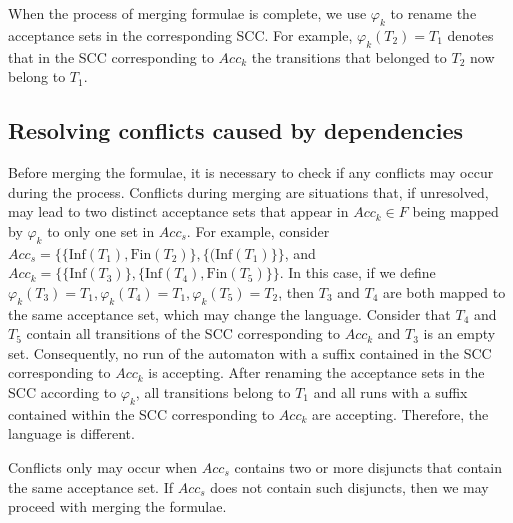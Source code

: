 \documentclass[
  digital, %
  twoside, %
  table,   %
  lof,     %
  lot,     %
]{fithesis3}
\begin{document}
When the process of merging formulae is complete, we use $\varphi_k$ to rename the acceptance sets in the corresponding SCC. For example, $\varphi_k (T_2) = T_1$ denotes that in the SCC corresponding to $Acc_k$ the transitions that belonged to $T_2$ now belong to $T_1$.

\subsection{Resolving conflicts caused by dependencies}
\label{subsec:resolve_conflicts}
Before merging the formulae, it is necessary to check if any conflicts may occur during the process. Conflicts during merging are situations that, if unresolved, may lead to two distinct acceptance sets that appear in $Acc_k \in F$ being mapped by $\varphi_k$ to only one set in $Acc_s$. For example, consider $Acc_s = \{\{\text{Inf}(T_1), \text{Fin}(T_2)\}, \{(\text{Inf}(T_1)\}\}$, and $Acc_k = \{\{\text{Inf}(T_3)\}, \{\text{Inf}(T_4), \text{Fin}(T_5)\}\}$. In this case, if we define $\varphi_k (T_3) = T_1, \varphi_k(T_4) = T_1, \varphi_k (T_5) = T_2$, then $T_3$ and $T_4$ are both mapped to the same acceptance set, which may change the language. Consider that $T_4$ and $T_5$ contain all transitions of the SCC corresponding to $Acc_k$ and $T_3$ is an empty set. Consequently, no run of the automaton with a suffix contained in the SCC corresponding to $Acc_k$ is accepting. After renaming the acceptance sets in the SCC according to $\varphi_k$, all transitions belong to $T_1$ and all runs with a suffix contained within the SCC corresponding to $Acc_k$ are accepting. Therefore, the language is different.

Conflicts only may occur when $Acc_s$ contains two or more disjuncts that contain the same acceptance set. If $Acc_s$ does not contain such disjuncts, then we may proceed with merging the formulae. 
 
\end{document}
